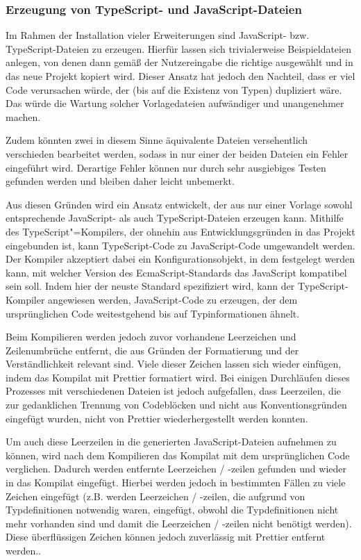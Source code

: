 \subsubsection{Erzeugung von TypeScript- und JavaScript-Dateien}
\label{impl:js_from_ts}
Im Rahmen der Installation vieler Erweiterungen sind JavaScript- bzw. TypeScript-Dateien zu erzeugen. Hierfür lassen sich trivialerweise Beispieldateien anlegen, von denen dann gemäß der Nutzereingabe die richtige ausgewählt und in das neue Projekt kopiert wird. Dieser Ansatz hat jedoch den Nachteil, dass er viel Code verursachen würde, der (bis auf die Existenz von Typen) dupliziert wäre. Das würde die Wartung solcher Vorlagedateien aufwändiger und unangenehmer machen.

Zudem könnten zwei in diesem Sinne äquivalente Dateien versehentlich verschieden bearbeitet werden, sodass in nur einer der beiden Dateien ein Fehler eingeführt wird. Derartige Fehler können nur durch sehr ausgiebiges Testen gefunden werden und bleiben daher leicht unbemerkt.

Aus diesen Gründen wird ein Ansatz entwickelt, der aus nur einer Vorlage sowohl entsprechende JavaScript- als auch TypeScript-Dateien erzeugen kann. Mithilfe des TypeScript"=Kompilers, der ohnehin aus Entwicklungsgründen in das Projekt eingebunden ist, kann TypeScript-Code zu JavaScript-Code umgewandelt werden. Der Kompiler akzeptiert dabei ein Konfigurationsobjekt, in dem festgelegt werden kann, mit welcher Version des EcmaScript-Standards das JavaScript kompatibel sein soll. Indem hier der neuste Standard spezifiziert wird, kann der TypeScript-Kompiler angewiesen werden, JavaScript-Code zu erzeugen, der dem ursprünglichen Code weitestgehend bis auf Typinformationen ähnelt.

Beim Kompilieren werden jedoch zuvor vorhandene Leerzeichen und Zeilenumbrüche entfernt, die aus Gründen der Formatierung und der Verständlichkeit relevant sind. Viele dieser Zeichen lassen sich wieder einfügen, indem das Kompilat mit Prettier formatiert wird. Bei einigen Durchläufen dieses Prozesses mit verschiedenen Dateien ist jedoch aufgefallen, dass Leerzeilen, die zur gedanklichen Trennung von Codeblöcken und nicht aus Konventionsgründen eingefügt wurden, nicht von Prettier wiederhergestellt werden konnten.

Um auch diese Leerzeilen in die generierten JavaScript-Dateien aufnehmen zu können, wird nach dem Kompilieren das Kompilat mit dem ursprünglichen Code verglichen. Dadurch werden entfernte Leerzeichen / -zeilen gefunden und wieder in das Kompilat eingefügt. Hierbei werden jedoch in bestimmten Fällen zu viele Zeichen eingefügt (z.B. werden Leerzeichen / -zeilen, die aufgrund von Typdefinitionen notwendig waren, eingefügt, obwohl die Typdefinitionen nicht mehr vorhanden sind und damit die Leerzeichen / -zeilen nicht benötigt werden). Diese überflüssigen Zeichen können jedoch zuverlässig mit Prettier entfernt werden..

